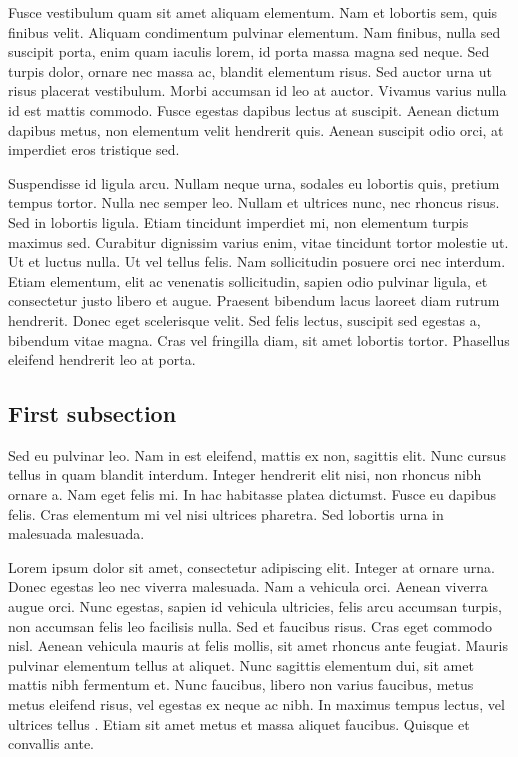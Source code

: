\documentclass{article}
\begin{document}
Fusce vestibulum quam sit amet aliquam elementum. Nam et lobortis sem, quis finibus velit. Aliquam condimentum pulvinar elementum. Nam finibus, nulla sed suscipit porta, enim quam iaculis lorem, id porta massa magna sed neque. Sed turpis dolor, ornare nec massa ac, blandit elementum risus. Sed auctor urna ut risus placerat vestibulum. Morbi accumsan id leo at auctor. Vivamus varius nulla id est mattis commodo. Fusce egestas dapibus lectus at suscipit. Aenean dictum dapibus metus, non elementum velit hendrerit quis. Aenean suscipit odio orci, at imperdiet eros tristique sed.

Suspendisse id ligula arcu. Nullam neque urna, sodales eu lobortis quis, pretium tempus tortor. Nulla nec semper leo. Nullam et ultrices nunc, nec rhoncus risus. Sed in lobortis ligula. Etiam tincidunt imperdiet mi, non elementum turpis maximus sed. Curabitur dignissim varius enim, vitae tincidunt tortor molestie ut. Ut et luctus nulla. Ut vel tellus felis. Nam sollicitudin posuere orci nec interdum. Etiam elementum, elit ac venenatis sollicitudin, sapien odio pulvinar ligula, et consectetur justo libero et augue. Praesent bibendum lacus laoreet diam rutrum hendrerit. Donec eget scelerisque velit. Sed felis lectus, suscipit sed egestas a, bibendum vitae magna. Cras vel fringilla diam, sit amet lobortis tortor. Phasellus eleifend hendrerit leo at porta.


\subsection{First subsection}

Sed eu pulvinar leo. Nam in est eleifend, mattis ex non, sagittis elit. Nunc cursus tellus in quam blandit interdum. Integer hendrerit elit nisi, non rhoncus nibh ornare a. Nam eget felis mi. In hac habitasse platea dictumst. Fusce eu dapibus felis. Cras elementum mi vel nisi ultrices pharetra. Sed lobortis urna in malesuada malesuada.

Lorem ipsum dolor sit amet, consectetur adipiscing elit. Integer at ornare urna. Donec egestas leo nec viverra malesuada. Nam a vehicula orci. Aenean viverra augue orci. Nunc egestas, sapien id vehicula ultricies, felis arcu accumsan turpis, non accumsan felis leo facilisis nulla. Sed et faucibus risus. Cras eget commodo nisl. Aenean vehicula mauris at felis mollis, sit amet rhoncus ante feugiat. Mauris pulvinar elementum tellus at aliquet. Nunc sagittis elementum dui, sit amet mattis nibh fermentum et. Nunc faucibus, libero non varius faucibus, metus metus eleifend risus, vel egestas ex neque ac nibh. In maximus tempus lectus, vel ultrices tellus \autocite{einstein_1935_can}. Etiam sit amet metus et massa aliquet faucibus. Quisque et convallis ante.
\end{document}
